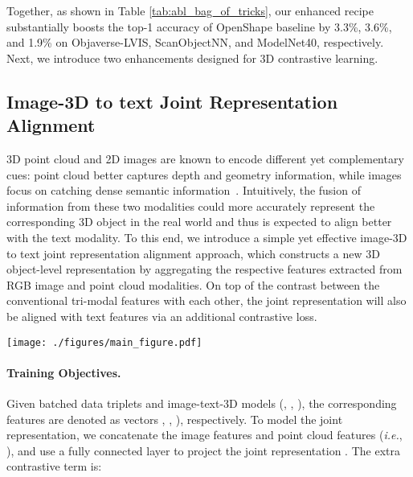 \documentclass{article} \usepackage{iclr2024_conference,times}
\def\ie{\textit{i.e.}}
\newcommand{\ourmethod}{MixCon3D}
\begin{document}
Together, as shown in Table \ref{tab:abl_bag_of_tricks}, our enhanced recipe substantially boosts the top-1 accuracy of OpenShape baseline by 3.3\%, 3.6\%, and 1.9\% on Objaverse-LVIS, ScanObjectNN, and ModelNet40, respectively. 
Next, we introduce two enhancements designed for 3D contrastive learning.


\subsection{Image-3D to text Joint Representation Alignment}
\label{subsec:joint_modal}
3D point cloud and 2D images are known to encode different yet complementary cues: point cloud better captures depth and geometry information, while images focus on catching dense semantic information~\citep{bai2022transfusion,liu2023bevfusion,chen2023bevdistill,Wang2023distillbev}. 
Intuitively, the fusion of information from these two modalities could more accurately represent the corresponding 3D object in the real world and thus is expected to align better with the text modality.
To this end, we introduce a simple yet effective image-3D to text joint representation alignment approach, which constructs a new 3D object-level representation by aggregating the respective features extracted from RGB image and point cloud modalities.
On top of the contrast between the conventional tri-modal features with each other, the joint representation will also be aligned with text features via an additional contrastive loss.

\begin{figure*}[!t]
  \centering
  \texttt{[image: ./figures/main\_figure.pdf]}
  \vspace{-1.5em}
   \caption{Summary of our \ourmethod~framework. \ourmethod~first extracts the representation of input triplets (images, text, point cloud) from a pre-trained vision-language model (\textit{e.g.}, CLIP) and a 3D encoder (\textit{e.g.}, PointBERT). Then, the image and point cloud features go through a projector to obtain the joint modal features, serving as complementary representations. The contrastive losses are applied to align features among three modalities (image-text-3D) and joint representation to text.}
   \label{fig:method}
\end{figure*}


\paragraph{Training Objectives.} 
Given batched data triplets  and image-text-3D models (, , ), the corresponding features are denoted as  vectors , , ), respectively. 
To model the joint representation, we concatenate the image features and point cloud features (\ie, ), and use a fully connected layer  to project the joint representation . The extra contrastive term is:
\end{document}
